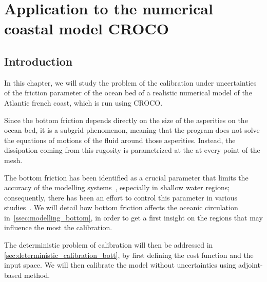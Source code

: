 \documentclass[../../Main_ManuscritThese.tex]{subfiles}
\newcommand{\CROCO}{CROCO}
\begin{document}
\chapter{Application to the numerical coastal model \CROCO}
\label{chap:croco}
\minitoc
\subfileLocal{\pagestyle{contentStyle}}

\section{Introduction}
\label{sec:intro_croco}


In this chapter, we will study the problem of the calibration under
uncertainties of the friction parameter of the ocean bed of a realistic
numerical model of the Atlantic french coast, which is run using \CROCO. 

Since the bottom friction depends directly on the size of the
asperities on the ocean bed, it is a subgrid phenomenon, meaning that
the program does not solve the equations of motions of the fluid
around those asperities. Instead, the dissipation coming from this
rugosity is parametrized at the at every point of the mesh.

The bottom friction has been identified as a crucial
parameter that limits the accuracy of the modelling
systems~\cite{sinha_principal_1997,kreitmair_effect_2019}, especially in shallow water
regions; consequently, there has been an effort to control this
parameter in various
studies~\cite{das_variational_1992,das_estimation_1991,boutet_estimation_2015}.
We will detail how bottom friction affects the oceanic circulation
in~\cref{ssec:modelling_bottom}, in order to get a first insight on
the regions that may influence the most the calibration.

The deterministic problem of calibration will then be addressed in
\cref{sec:deterministic_calibration_bott}, by first defining the cost
function and the input space. We will then calibrate the model
without uncertainties using adjoint-based method.
\end{document}
